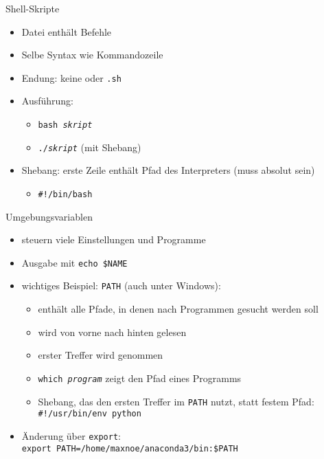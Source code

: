 \begin{frame}{Shell-Skripte}
  \begin{itemize}
    \item Datei enthält Befehle
    \item Selbe Syntax wie Kommandozeile
    \item Endung: keine oder \texttt{.sh}
    \item Ausführung:
      \begin{itemize}
        \item \texttt{bash \textit{skript}}
        \item \texttt{./\textit{skript}} (mit Shebang)
      \end{itemize}
    \item Shebang: erste Zeile enthält Pfad des Interpreters (muss absolut sein)
      \begin{itemize}
        \item \texttt{\#!/bin/bash}
      \end{itemize}
  \end{itemize}
\end{frame}

\begin{frame}{Umgebungsvariablen}
  \begin{itemize}
    \item steuern viele Einstellungen und Programme
    \item Ausgabe mit \texttt{echo \$NAME}
    \item wichtiges Beispiel: \texttt{PATH} (auch unter Windows):
      \begin{itemize}
        \item enthält alle Pfade, in denen nach Programmen gesucht werden soll
        \item wird von vorne nach hinten gelesen
        \item erster Treffer wird genommen
        \item \texttt{which \textit{program}} zeigt den Pfad eines Programms
        \item Shebang, das den ersten Treffer im \texttt{PATH} nutzt, statt festem Pfad: \texttt{\#!/usr/bin/env python}
      \end{itemize}
    \item Änderung über \texttt{export}:\\
      \texttt{export PATH=/home/maxnoe/anaconda3/bin:\$PATH}
  \end{itemize} 
\end{frame}

